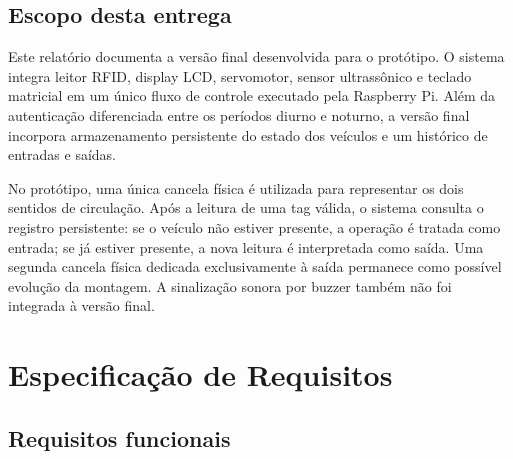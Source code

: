 \documentclass[11pt,a4paper]{article}
\begin{document}
\subsection{Escopo desta entrega}

Este relatório documenta a versão final desenvolvida para o protótipo. O sistema
integra leitor RFID, display LCD, servomotor, sensor ultrassônico e teclado
matricial em um único fluxo de controle executado pela Raspberry Pi. Além da
autenticação diferenciada entre os períodos diurno e noturno, a versão final
incorpora armazenamento persistente do estado dos veículos e um histórico de
entradas e saídas.

No protótipo, uma única cancela física é utilizada para representar os dois
sentidos de circulação. Após a leitura de uma tag válida, o sistema consulta o
registro persistente: se o veículo não estiver presente, a operação é tratada
como entrada; se já estiver presente, a nova leitura é interpretada como saída.
Uma segunda cancela física dedicada exclusivamente à saída permanece como
possível evolução da montagem. A sinalização sonora por buzzer também não foi
integrada à versão final.

\section{Especificação de Requisitos}

\subsection{Requisitos funcionais}
\end{document}
